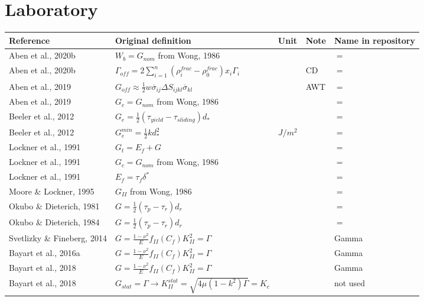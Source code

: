 \documentclass{article}
\begin{document}
\section{Laboratory}

\begin{longtable}{|p{4 cm}|p{8 cm}|p{1.25 cm}|p{1.25 cm}|p{1.5 cm}|}
\hline
\textbf{Reference} & \textbf{Original definition} & \textbf{Unit} & \textbf{Note} & \textbf{Name in repository} \\ \hline
Aben et al., 2020b & \(\displaystyle W_b = G_{nom} \) from Wong, 1986 & & & $=$ \\
Aben et al., 2020b & \(\displaystyle \Gamma_{off} = 2 \sum_{i=1}^{n} (\rho_{i}^{frac}-\rho_{0}^{frac}) x_i \Gamma_i \) & & CD & $=$ \\
Aben et al., 2019 & \( \displaystyle G_{off} \approx \frac{1}{2} w \overline{\sigma}_{ij} \Delta S_{ijkl} \overline{\sigma}_{kl} \) & & AWT & $=$ \\
Aben et al., 2019 & \( \displaystyle G_c=G_{nom} \) from Wong, 1986 & & & $=$ \\
Beeler et al., 2012 & \( \displaystyle G_e = \frac{1}{2} (\tau_{yield}-\tau_{sliding}) d_* \) & & & $=$ \\
Beeler et al., 2012 & \( \displaystyle G_e^{min} = \frac{1}{2} k d_*^2 \) & $J/m^2$ & & $=$ \\
Lockner et al., 1991 & \( \displaystyle G_t = E_f + G \) & & & $=$ \\
Lockner et al., 1991 & \( \displaystyle G_c = G_{nom} \) from Wong, 1986 & & & $=$ \\
Lockner et al., 1991 & \( \displaystyle E_f = \tau_f \delta^* \)& & & $=$ \\
Moore \& Lockner, 1995 & \( \displaystyle G_{II} \) from Wong, 1986 & & & $=$ \\
Okubo \& Dieterich, 1981 & \( \displaystyle G = \frac{1}{2} (\tau_p - \tau_r) d_r \) & & & $=$ \\
Okubo \& Dieterich, 1984 & \( \displaystyle G = \frac{1}{2} (\tau_p - \tau_r) d_r \) & & & $=$ \\
Svetlizky \& Fineberg, 2014 & \( \displaystyle G = \frac{1-\nu^2}{E} f_{II}(C_f) K_{II}^2 = \Gamma \) & & & Gamma \\
Bayart et al., 2016a & \( \displaystyle G = \frac{1-\nu^2}{E} f_{II}(C_f) K_{II}^2 = \Gamma \) & & & Gamma \\
Bayart et al., 2018 & \( \displaystyle G = \frac{1-\nu^2}{E} f_{II}(C_f) K_{II}^2 = \Gamma \) & & & Gamma \\
Bayart et al., 2018 & \( \displaystyle G_{stat} = \Gamma \rightarrow K_{II}^{stat} = \sqrt{4 \mu (1-k^2) \Gamma} = K_c \) & & & not used \\

\end{longtable}
\end{document}
